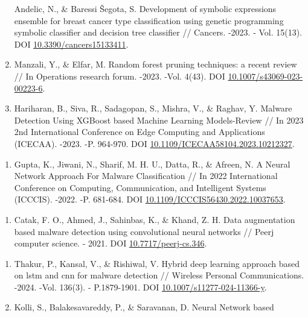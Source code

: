 \begin{references}
\begin{enumerate}
  Andelic, N., \& Baressi Šegota, S. Development of symbolic expressions
  ensemble for breast cancer type classification using genetic
  programming symbolic classifier and decision tree classifier //
  Cancers. -2023. - Vol. 15(13). DOI
  \href{https://doi.org/10.3390/cancers15133411}{10.3390/cancers15133411}.
\item
  Manzali, Y., \& Elfar, M. Random forest pruning techniques: a recent
  review // In Operations research forum. -2023. -Vol. 4(43). DOI
  \href{https://doi.org/10.1007/s43069-023-00223-6}{10.1007/s43069-023-00223-6}.
\item
  Hariharan, B., Siva, R., Sadagopan, S., Mishra, V., \& Raghav, Y.
  Malware Detection Using XGBoost based Machine Learning Models-Review
  // In 2023 2nd International Conference on Edge Computing and
  Applications (ICECAA). -2023. -P. 964-970.
DOI \href{https://doi.org/10.1109/ICECAA58104.2023.10212327}{10.1109/ICECAA58104.2023.10212327}.
\end{enumerate}
\begin{enumerate}
\def\labelenumi{\arabic{enumi}.}
\setcounter{enumi}{15}
\item
  Gupta, K., Jiwani, N., Sharif, M. H. U., Datta, R., \& Afreen, N. A
  Neural Network Approach For Malware Classification // In 2022
  International Conference on Computing, Communication, and Intelligent
  Systems (ICCCIS). -2022. -P. 681-684.
DOI \href{https://doi.org/10.1109/ICCCIS56430.2022.10037653}{10.1109/ICCCIS56430.2022.10037653}.
\end{enumerate}
\begin{enumerate}
\def\labelenumi{\arabic{enumi}.}
\setcounter{enumi}{16}
\item
  Catak, F. O., Ahmed, J., Sahinbas, K., \& Khand, Z. H. Data
  augmentation based malware detection using convolutional neural
  networks // Peerj computer science. - 2021.
DOI \href{https://doi.org/10.7717/peerj-cs.346}{10.7717/peerj-cs.346}.
\end{enumerate}
\begin{enumerate}
\def\labelenumi{\arabic{enumi}.}
\setcounter{enumi}{17}
\item
  Thakur, P., Kansal, V., \& Rishiwal, V. Hybrid deep learning approach
  based on lstm and cnn for malware detection // Wireless Personal
  Communications. -2024. -Vol. 136(3). - P.1879-1901. DOI
  \href{https://doi.org/10.1007/s11277-024-11366-y}{10.1007/s11277-024-11366-y}.
\item
  Kolli, S., Balakesavareddy, P., \& Saravanan, D. Neural Network based

\end{enumerate}
\end{references}
